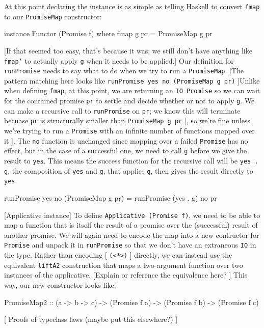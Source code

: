 \documentclass[12pt, english, letterpaper]{kuthesis}
\newcommand{\lit}[1]{\texttt{#1}}
\begin{document}
At this point declaring the instance is as simple as telling Haskell to convert \lit{fmap} to our \lit{PromiseMap} constructor:
\begin{code}
instance Functor (Promise f) where
    fmap g pr = PromiseMap g pr
\end{code}
[If that seemed too easy, that's because it was; we still don't have anything like \lit{fmap'} to actually apply \lit g when it needs to be applied.]  Our definition for \lit{runPromise} needs to say what to do when we try to run a \lit{PromiseMap}.  [The pattern matching here looks like \lit{runPromise yes no (PromiseMap g pr)} ]Unlike when defining \lit{fmap}, at this point, we are returning an \lit{IO Promise} so we can wait for the contained promise \lit{pr} to settle and decide whether or not to apply \lit g.  We can make a recursive call to \lit{runPromise} on \lit{pr}; we know this will terminate becuase \lit{pr} is structurally smaller than \lit{PromiseMap g pr} [, so we're fine unless we're trying to run a \lit{Promise} with an infinite number of functions mapped over it ].  The \lit{no} function is unchanged since mapping over a failed \lit{Promise} has no effect, but in the case of a successful one, we need to call \lit g before we give the result to \lit{yes}.  This means the success function for the recursive call will be \lit{yes . g}, the composition of \lit{yes} and \lit g, that applies \lit g, then gives the result directly to \lit{yes}.
\begin{code}
runPromise yes no (PromiseMap g pr) = runPromise (yes . g) no pr
\end{code}

[Applicative instance] To define \lit{Applicative (Promise f)}, we need to be able to map a function that is itself the result of a promise over the (successful) result of another promise.  We will again need to encode the map into a new contructor for \lit{Promise} and unpack it in \lit{runPromise} so that we don't have an extraneous \lit{IO} in the type.  Rather than encoding [ \lit{(<*>)} ] directly, we can instead use the equivalent \lit{liftA2} construction that maps a two-argument function over two instances of the applicative. [Explain or reference the equivalence here? ]  This way, our new constructor looks like:
\begin{code}
  PromiseMap2 ::  (a -> b -> c) -> (Promise f a) -> (Promise f b) -> (Promise f c)
\end{code}


[ Proofs of typeclass laws (maybe put this elsewhere?) ]
\end{document}
